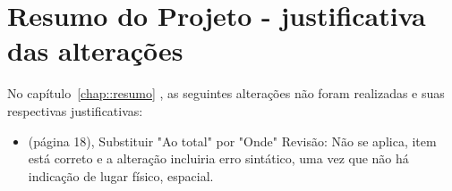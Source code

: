 \section{Resumo do Projeto - justificativa das alterações}


No capítulo~\ref{chap::resumo} , as seguintes alterações
não foram realizadas e suas respectivas justificativas:

\begin{itemize}
  \item (página 18), Substituir "Ao total" por "Onde"
  Revisão:
  Não se aplica, item está correto e a alteração incluiria erro sintático, uma vez que não há indicação de lugar físico, espacial.
\end{itemize}